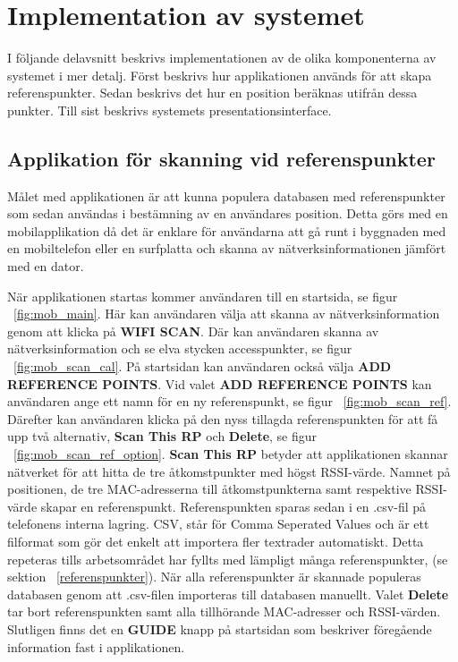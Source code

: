 \documentclass[a4paper,12pt]{article}
\begin{document}
 \section{Implementation av systemet}
 I följande delavsnitt beskrivs implementationen av de olika komponenterna av systemet i mer detalj. Först beskrivs hur applikationen används för att skapa referenspunkter. Sedan beskrivs det hur en position beräknas utifrån dessa punkter. Till sist beskrivs systemets presentationsinterface.

 \subsection{Applikation för skanning vid referenspunkter}
 Målet med applikationen är att kunna populera databasen med referenspunkter som sedan användas i bestämning av en användares position. Detta görs med en mobilapplikation då det är enklare för användarna att gå runt i byggnaden med en mobiltelefon eller en surfplatta och skanna av nätverksinformationen jämfört med en dator.

 När applikationen startas kommer användaren till en startsida, se figur ~\ref{fig:mob_main}. Här kan användaren välja att skanna av nätverksinformation genom att klicka på \textbf{WIFI SCAN}. Där kan användaren skanna av nätverksinformation och se elva stycken accesspunkter, se figur ~\ref{fig:mob_scan_cal}. På startsidan kan användaren också välja \textbf{ADD REFERENCE POINTS}. Vid valet \textbf{ADD REFERENCE POINTS} kan användaren ange ett namn för en ny referenspunkt, se figur ~\ref{fig:mob_scan_ref}. Därefter kan användaren klicka på den nyss tillagda referenspunkten för att få upp två alternativ, \textbf{Scan This RP} och \textbf{Delete}, se figur ~\ref{fig:mob_scan_ref_option}. \textbf{Scan This RP} betyder att applikationen skannar nätverket för att hitta de tre åtkomstpunkter med högst RSSI-värde. Namnet på positionen, de tre MAC-adresserna till åtkomstpunkterna samt respektive RSSI-värde skapar en referenspunkt. Referenspunkten sparas sedan i en .csv-fil på telefonens interna lagring.
 CSV, står för Comma Seperated Values och är ett filformat som gör det enkelt att importera fler textrader automatiskt. Detta repeteras tills arbetsområdet har fyllts med lämpligt många referenspunkter, (se sektion ~\ref{referenspunkter}). När alla referenspunkter är skannade populeras databasen genom att .csv-filen importeras till databasen manuellt. Valet \textbf{Delete} tar bort referenspunkten samt alla tillhörande MAC-adresser och RSSI-värden. Slutligen finns det en \textbf{GUIDE} knapp på startsidan som beskriver föregående information fast i applikationen.
\end{document}
